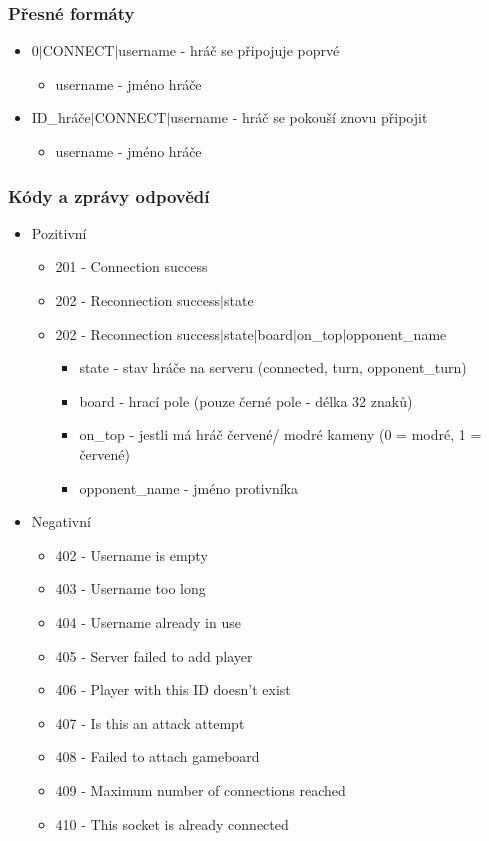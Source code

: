\documentclass[12pt]{report}
\begin{document}
\subsubsection{Přesné formáty}
\begin{itemize}
	\item 0$|$CONNECT$|$username - hráč se připojuje poprvé
		\begin{itemize}
			\item username - jméno hráče
		\end{itemize}
	\item ID\_hráče$|$CONNECT$|$username - hráč se pokouší znovu připojit
		\begin{itemize}
			\item username - jméno hráče
		\end{itemize}
\end{itemize}

\subsubsection{Kódy a zprávy odpovědí}
\begin{itemize}
	\item Pozitivní
		\begin{itemize}
			\item 201 - Connection success
			\item 202 - Reconnection success$|$state
			\item 202 - Reconnection success$|$state$|$board$|$on\_top$|$opponent\_name
				\begin{itemize}
					\item state - stav hráče na serveru (connected, turn, opponent\_turn)
					\item board - hrací pole (pouze černé pole - délka 32 znaků)
					\item on\_top - jestli má hráč červené/ modré kameny (0 = modré, 1 = červené)
					\item opponent\_name - jméno protivníka
				\end{itemize}
		\end{itemize}
	\item Negativní
		\begin{itemize}
			\item 402 - Username is empty
			\item 403 - Username too long
			\item 404 - Username already in use
			\item 405 - Server failed to add player
			\item 406 - Player with this ID doesn't exist
			\item 407 - Is this an attack attempt
			\item 408 - Failed to attach gameboard
			\item 409 - Maximum number of connections reached
			\item 410 - This socket is already connected
		\end{itemize}
\end{itemize}
%
%
%
\end{document}
